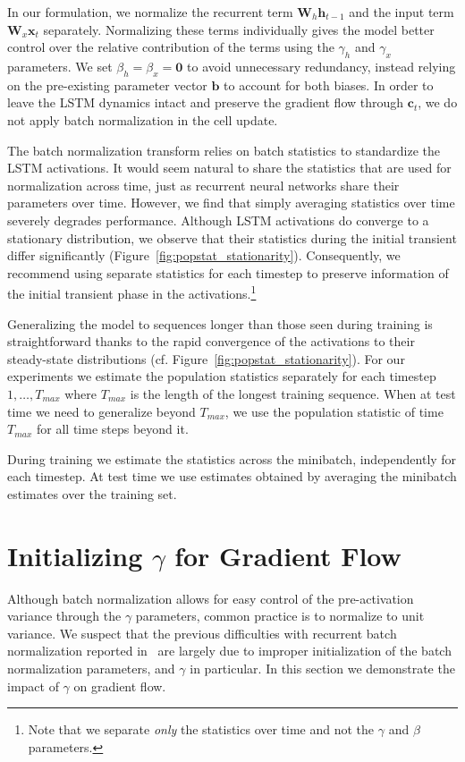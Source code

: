 \documentclass{article} %
\newcommand{\vect}[1]{\mathbf{#1}}
\newcommand{\mat}[1]{\mathbf{#1}}
\begin{document}
In our formulation, we normalize the recurrent term $\mat{W}_h \vect{h}_{t-1}$ and the input term $\mat{W}_x \vect{x}_t$ separately.
Normalizing these terms individually gives the model better control over the relative contribution of the terms using the $\gamma_h$ and $\gamma_x$ parameters.
We set $\beta_h = \beta_x = \vect{0}$ to avoid unnecessary redundancy, instead relying on the pre-existing parameter vector $\vect{b}$ to account for both biases.
In order to leave the LSTM dynamics intact and preserve the gradient flow through $\vect{c}_t$, we do not apply batch normalization in the cell update.

The batch normalization transform relies on batch statistics to standardize the LSTM activations.
It would seem natural to share the statistics that are used for normalization across time,
just as recurrent neural networks share their parameters over time.
However, we find that simply averaging statistics over time severely degrades performance.
Although LSTM activations do converge to a stationary distribution, we observe that their statistics during the initial transient differ significantly (Figure~\ref{fig:popstat_stationarity}).
Consequently, we recommend using separate statistics for each timestep to preserve
information of the initial transient phase in the activations.\footnote{
Note that we separate \emph{only} the statistics over time and not the $\gamma$ and $\beta$ parameters.}

Generalizing the model to sequences longer than those seen during training
is straightforward thanks to the rapid convergence of the activations
to their steady-state distributions (cf. Figure~\ref{fig:popstat_stationarity}).
For our experiments we estimate the population statistics separately for each timestep $1, \ldots, T_{max}$ where $T_{max}$ is the length of the longest training sequence.
When at test time we need to generalize beyond $T_{max}$, we use the population statistic of time $T_{max}$ for all time steps beyond it.

During training we estimate the statistics across the minibatch, independently for each timestep.
At test time we use estimates obtained by averaging the minibatch estimates over the training set.


\section{Initializing $\gamma$ for Gradient Flow}
\label{sec:activation-variance}

Although batch normalization allows for easy control of the pre-activation variance through the $\gamma$ parameters,
common practice is to normalize to unit variance.
We suspect that the previous difficulties with recurrent batch normalization reported in~\citet{cesar,baidu}
are largely due to improper initialization of the batch normalization parameters, and $\gamma$ in particular.
In this section we demonstrate the impact of $\gamma$ on gradient flow.
\end{document}
